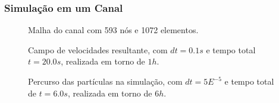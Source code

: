 \documentclass{beamer}
\begin{document}
\begin{frame}
  \frametitle{Simulação em um Canal}
  
  \begin{figure}
     {\raggedleft \tiny Malha do canal com 593 nós e 1072 elementos.}
  \end{figure}
  \vspace*{-\baselineskip}\setlength\belowdisplayshortskip{0pt} %
  \begin{figure}
     {\raggedleft \tiny Campo de velocidades resultante, com $dt=0.1s$ e tempo total $t=20.0s$, realizada em torno de $1h$.}
  \end{figure}
  \vspace*{-\baselineskip}\setlength\belowdisplayshortskip{0pt} %
  \begin{figure}
     {\raggedleft \tiny Percurso das partículas na simulação, com $dt=5E^{-5}$ e tempo total de $t=6.0s$, realizada em torno de $6h$.}
  \end{figure}
\end{frame}

\end{document}
